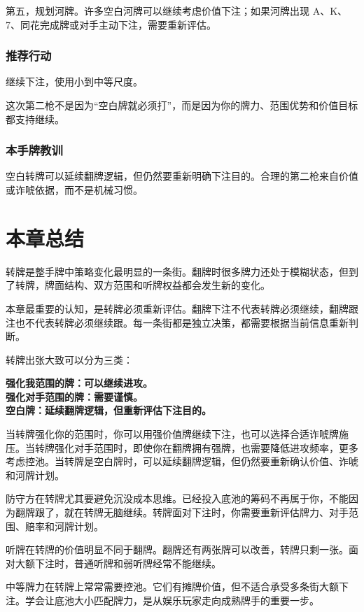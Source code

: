 第五，规划河牌。许多空白河牌可以继续考虑价值下注；如果河牌出现 A、K、7、同花完成牌或对手主动下注，需要重新评估。

\subsubsection*{推荐行动}

继续下注，使用小到中等尺度。

这次第二枪不是因为“空白牌就必须打”，而是因为你的牌力、范围优势和价值目标都支持继续。

\subsubsection*{本手牌教训}

空白转牌可以延续翻牌逻辑，但仍然要重新明确下注目的。合理的第二枪来自价值或诈唬依据，而不是机械习惯。

\section{本章总结}

转牌是整手牌中策略变化最明显的一条街。翻牌时很多牌力还处于模糊状态，但到了转牌，牌面结构、双方范围和听牌权益都会发生新的变化。

本章最重要的认知，是转牌必须重新评估。翻牌下注不代表转牌必须继续，翻牌跟注也不代表转牌必须继续跟。每一条街都是独立决策，都需要根据当前信息重新判断。

转牌出张大致可以分为三类：

\begin{center}
\textbf{强化我范围的牌：可以继续进攻。\\
强化对手范围的牌：需要谨慎。\\
空白牌：延续翻牌逻辑，但重新评估下注目的。}
\end{center}

当转牌强化你的范围时，你可以用强价值牌继续下注，也可以选择合适诈唬牌施压。当转牌强化对手范围时，即使你在翻牌拥有强牌，也需要降低进攻频率，更多考虑控池。当转牌是空白牌时，可以延续翻牌逻辑，但仍然要重新确认价值、诈唬和河牌计划。

防守方在转牌尤其要避免沉没成本思维。已经投入底池的筹码不再属于你，不能因为翻牌跟了，就在转牌无脑继续。转牌面对下注时，你需要重新评估牌力、对手范围、赔率和河牌计划。

听牌在转牌的价值明显不同于翻牌。翻牌还有两张牌可以改善，转牌只剩一张。面对大额下注时，普通听牌和弱听牌经常不能继续。

中等牌力在转牌上常常需要控池。它们有摊牌价值，但不适合承受多条街大额下注。学会让底池大小匹配牌力，是从娱乐玩家走向成熟牌手的重要一步。

